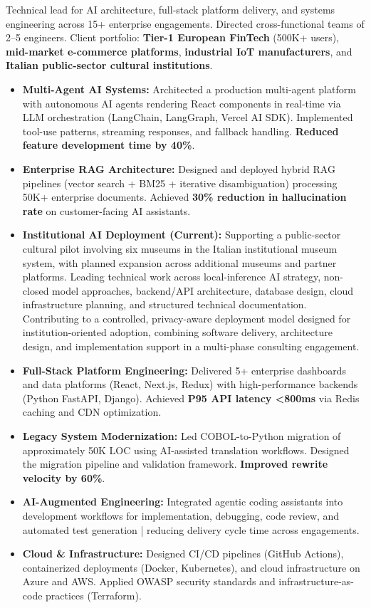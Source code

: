 \documentclass[11pt, letterpaper]{article}
\begin{document}
\noindent Technical lead for AI architecture, full-stack platform delivery, and systems engineering across 15+ enterprise engagements. Directed cross-functional teams of 2--5 engineers. Client portfolio: \textbf{Tier-1 European FinTech} (500K+ users), \textbf{mid-market e-commerce platforms}, \textbf{industrial IoT manufacturers}, and \textbf{Italian public-sector cultural institutions}.

\begin{itemize}
    \item \textbf{Multi-Agent AI Systems:} Architected a production multi-agent platform with autonomous AI agents rendering React components in real-time via LLM orchestration (LangChain, LangGraph, Vercel AI SDK). Implemented tool-use patterns, streaming responses, and fallback handling. \textbf{Reduced feature development time by 40\%}.
    \item \textbf{Enterprise RAG Architecture:} Designed and deployed hybrid RAG pipelines (vector search + BM25 + iterative disambiguation) processing 50K+ enterprise documents. Achieved \textbf{30\% reduction in hallucination rate} on customer-facing AI assistants.
    \item \textbf{Institutional AI Deployment (Current):} Supporting a public-sector cultural pilot involving six museums in the Italian institutional museum system, with planned expansion across additional museums and partner platforms. Leading technical work across local-inference AI strategy, non-closed model approaches, backend/API architecture, database design, cloud infrastructure planning, and structured technical documentation. Contributing to a controlled, privacy-aware deployment model designed for institution-oriented adoption, combining software delivery, architecture design, and implementation support in a multi-phase consulting engagement.
    \item \textbf{Full-Stack Platform Engineering:} Delivered 5+ enterprise dashboards and data platforms (React, Next.js, Redux) with high-performance backends (Python FastAPI, Django). Achieved \textbf{P95 API latency <800ms} via Redis caching and CDN optimization.
    \item \textbf{Legacy System Modernization:} Led COBOL-to-Python migration of approximately 50K LOC using AI-assisted translation workflows. Designed the migration pipeline and validation framework. \textbf{Improved rewrite velocity by 60\%}.
    \item \textbf{AI-Augmented Engineering:} Integrated agentic coding assistants into development workflows for implementation, debugging, code review, and automated test generation | reducing delivery cycle time across engagements.
    \item \textbf{Cloud \& Infrastructure:} Designed CI/CD pipelines (GitHub Actions), containerized deployments (Docker, Kubernetes), and cloud infrastructure on Azure and AWS. Applied OWASP security standards and infrastructure-as-code practices (Terraform).
\end{itemize}
\end{document}
